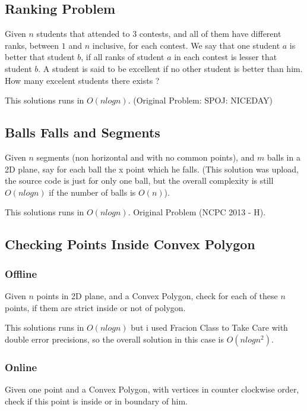\documentclass{report}
\begin{document}
        \subsection{Ranking Problem}
        Given $n$ students that attended to $3$ contests, and all of them have different ranks, between $1$ and $n$ inclusive, for each contest. We say that one student $a$ is better that student $b$, if all ranks of student $a$ in each contest is lesser that student $b$. A student is said to be excellent if no other student is better than him. How many excelent students there exists ?
        
        This solutions runs in $O(nlogn)$. (Original Problem: SPOJ: NICEDAY)
        
        
        \newpage
        \subsection{Balls Falls and Segments}
        Given $n$ segments (non horizontal and with no common points), and $m$ balls in a 2D plane, say for each ball the x point which he falls. (This solution was upload, the source code is just for only one ball, but the overall complexity is still $O(nlogn)$ if the number of balls is $O(n)$).
        
        This solutions runs in $O(nlogn)$. Original Problem (NCPC 2013 - H).
        
        
        \newpage
        \subsection{Checking Points Inside Convex Polygon}
            \subsubsection{Offline}
            Given $n$ points in 2D plane, and a Convex Polygon, check for each of these $n$ points, if them are strict inside or not of polygon.
            
            This solutions runs in $O(nlogn)$ but i used Fracion Class to Take Care with double error precisions, so the overall solution in this case is $O(nlogn^2)$.
            
            
            \newpage
            \subsubsection{Online}
            Given one point and a Convex Polygon, with vertices in counter clockwise order, check if this point is inside or in boundary of him.
            
\end{document}
